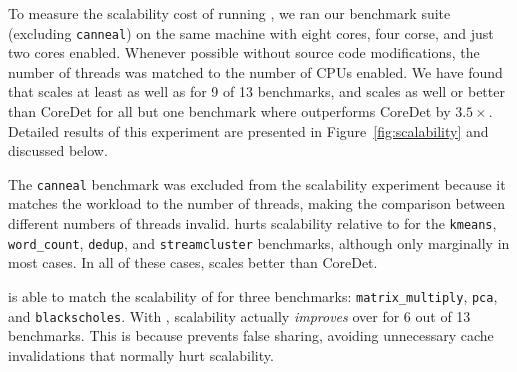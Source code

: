 \label{sec:scalability}


To measure the scalability cost of running \dthreads{}, we ran our
benchmark suite (excluding \texttt{canneal}) on the same machine with
eight cores, four corse, and just two cores enabled.  Whenever possible
without source code modifications, the number of threads was matched
to the number of CPUs enabled.  We have found that \dthreads{} scales
at least as well as \pthreads{} for 9 of 13 benchmarks, and scales as
well or better than CoreDet for all but one benchmark
where \dthreads{} outperforms CoreDet by $3.5\times$.  Detailed results of this
experiment are presented in Figure~\ref{fig:scalability} and discussed
below.

The \texttt{canneal} benchmark was excluded from the scalability experiment because it matches the workload to the number of threads, making
the comparison between different numbers of threads invalid.  \dthreads{}
hurts scalability relative to \pthreads{} for the \texttt{kmeans}, \texttt{word\_count}, \texttt{dedup}, and \texttt{streamcluster} benchmarks,
although only marginally in most cases.  In all of these cases, \dthreads{} scales better than CoreDet.

\dthreads{} is able to match the scalability of \pthreads{} for three
benchmarks: \texttt{matrix\_multiply}, \texttt{pca},
and \texttt{blackscholes}.  With \dthreads{}, scalability
actually \emph{improves} over \pthreads{} for 6 out of 13
benchmarks.  This is because \dthreads{} prevents false sharing, avoiding 
unnecessary cache invalidations that normally hurt scalability.

